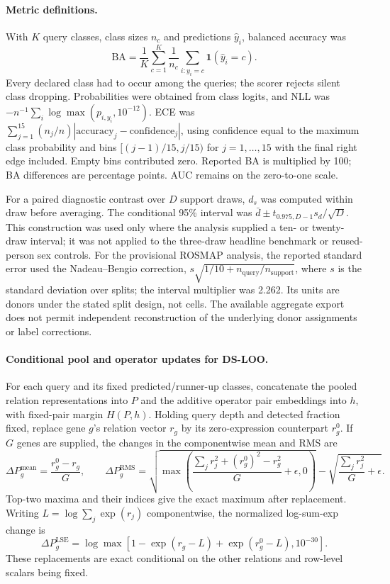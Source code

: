 \paragraph{Metric definitions.}
With $K$ query classes, class sizes $n_c$ and predictions $\hat y_i$, balanced accuracy was
\[
 \mathrm{BA}=\frac{1}{K}\sum_{c=1}^{K}\frac{1}{n_c}
             \sum_{i:y_i=c}\mathbf{1}(\hat y_i=c).
\]
Every declared class had to occur among the queries; the scorer rejects silent class dropping. Probabilities were obtained from class logits, and NLL was $-n^{-1}\sum_i\log\max(p_{i,y_i},10^{-12})$. ECE was $\sum_{j=1}^{15}(n_j/n)|\mathrm{accuracy}_j-\mathrm{confidence}_j|$, using confidence equal to the maximum class probability and bins $[(j-1)/15,j/15)$ for $j=1,\ldots,15$ with the final right edge included. Empty bins contributed zero. Reported BA is multiplied by 100; BA differences are percentage points. AUC remains on the zero-to-one scale.

For a paired diagnostic contrast over $D$ support draws, $d_s$ was computed within draw before averaging. The conditional 95\% interval was $\bar d\pm t_{0.975,D-1}s_d/\sqrt D$. This construction was used only where the analysis supplied a ten- or twenty-draw interval; it was not applied to the three-draw headline benchmark or reused-person sex controls. For the provisional ROSMAP analysis, the reported standard error used the Nadeau--Bengio correction\cite{nadeau2003inference}, $s\sqrt{1/10+n_{\mathrm{query}}/n_{\mathrm{support}}}$, where $s$ is the standard deviation over splits; the interval multiplier was 2.262. Its units are donors under the stated split design, not cells. The available aggregate export does not permit independent reconstruction of the underlying donor assignments or label corrections.

\paragraph{Conditional pool and operator updates for DS-LOO.}
For each query and its fixed predicted/runner-up classes, concatenate the pooled relation representations into $P$ and the additive operator pair embeddings into $h$, with fixed-pair margin $H(P,h)$. Holding query depth and detected fraction fixed, replace gene $g$'s relation vector $r_g$ by its zero-expression counterpart $r_g^0$. If $G$ genes are supplied, the changes in the componentwise mean and RMS are
\[
 \Delta P_g^{\mathrm{mean}}=\frac{r_g^0-r_g}{G},\qquad
 \Delta P_g^{\mathrm{RMS}}=
 \sqrt{\max\!\left(\frac{\sum_j r_j^2+(r_g^0)^2-r_g^2}{G}+\epsilon,0\right)}
 -\sqrt{\frac{\sum_j r_j^2}{G}+\epsilon}.
\]
Top-two maxima and their indices give the exact maximum after replacement. Writing $L=\log\sum_j\exp(r_j)$ componentwise, the normalized log-sum-exp change is
\[
 \Delta P_g^{\mathrm{LSE}}=
 \log\max\!\left[1-\exp(r_g-L)+\exp(r_g^0-L),10^{-30}\right].
\]
These replacements are exact conditional on the other relations and row-level scalars being fixed.


